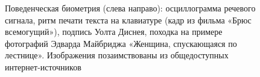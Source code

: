 \documentclass[12pt]{book}
\begin{document}
\begin{figure}[]
\caption{Поведенческая биометрия (слева направо): осциллограмма речевого сигнала, ритм печати текста на клавиатуре (кадр из фильма «Брюс всемогущий»), подпись Уолта Диснея, походка на примере фотографий Эдварда Майбриджа «Женщина, спускающаяся по лестнице». Изображения позаимствованы из общедоступных интернет-источников}
\label{fig:figure_1_5}
\end{figure}
\end{document}
